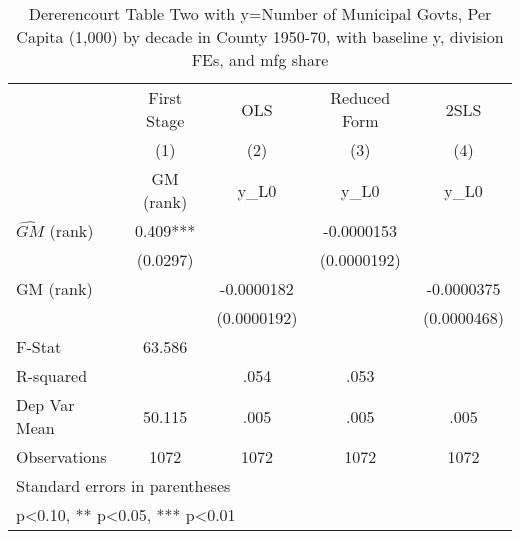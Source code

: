 \begin{table}[htbp]\centering
\def\sym#1{\ifmmode^{#1}\else\(^{#1}\)\fi}
\caption{Dererencourt Table Two with y=Number of Municipal Govts, Per Capita (1,000) by decade in County 1950-70, with baseline y, division FEs, and mfg share}
\begin{tabular}{l*{4}{c}}
\toprule
                    & First Stage   &         OLS   &Reduced Form   &        2SLS   \\
                    &\multicolumn{1}{c}{(1)}&\multicolumn{1}{c}{(2)}&\multicolumn{1}{c}{(3)}&\multicolumn{1}{c}{(4)}\\
                    &\multicolumn{1}{c}{GM  (rank)}&\multicolumn{1}{c}{y\_L0}&\multicolumn{1}{c}{y\_L0}&\multicolumn{1}{c}{y\_L0}\\
\midrule
$\hat{GM}$ (rank)   &       0.409***&               &  -0.0000153   &               \\
                    &    (0.0297)   &               & (0.0000192)   &               \\
\addlinespace
GM  (rank)          &               &  -0.0000182   &               &  -0.0000375   \\
                    &               & (0.0000192)   &               & (0.0000468)   \\
\midrule
F-Stat              &      63.586   &               &               &               \\
R-squared           &               &        .054   &        .053   &               \\
Dep Var Mean        &      50.115   &        .005   &        .005   &        .005   \\
Observations        &        1072   &        1072   &        1072   &        1072   \\
\bottomrule
\multicolumn{5}{l}{\footnotesize Standard errors in parentheses}\\
\multicolumn{5}{l}{\footnotesize * p<0.10, ** p<0.05, *** p<0.01}\\
\end{tabular}
\end{table}
